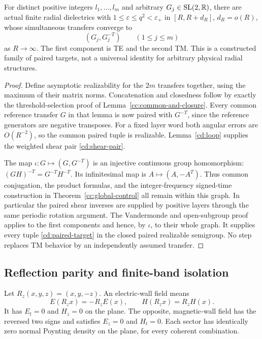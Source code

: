 \begin{theorem}
\label{cd:paired-control}
For distinct positive integers $l_1,\ldots,l_m$ and arbitrary
$G_j\in{\rm SL}(2,\mathbb R)$, there are actual finite radial
dielectrics with $1\leq\varepsilon\leq q^2<\varepsilon_+$ in
$[R,R+d_R]$, $d_R=o(R)$, whose simultaneous transfers converge to
\begin{equation}\label{cd:paired-target}
 (G_j,G_j^{-T})\qquad(1\leq j\leq m)
\end{equation}
as $R\to\infty$. The first component is TE and the second TM.
This is a constructed family of paired targets, not a universal
identity for arbitrary physical radial structures.
\end{theorem}
\begin{proof}
Define asymptotic realizability for the $2m$ transfers together,
using the maximum of their matrix norms. Concatenation and
closedness follow by exactly the threshold-selection proof of
Lemma~\ref{cc:common-and-closure}.
Every common reference transfer $G$ in that lemma is now paired
with $G^{-T}$, since the reference generators are negative
transposes. For a fixed layer word both angular errors are
$O(R^{-2})$, so the common paired tuple is realizable.
Lemma~\ref{cd:loop} supplies the weighted shear pair
\eqref{cd:shear-pair}.

The map $\iota:G\mapsto(G,G^{-T})$ is an injective continuous
group homomorphism: $(GH)^{-T}=G^{-T}H^{-T}$. Its infinitesimal
map is $A\mapsto(A,-A^T)$. Thus common conjugation, the product
formulas, and the integer-frequency signed-time construction in
Theorem~\ref{cc:global-control} all remain within this graph.
In particular the paired shear inverses are supplied by positive
layers through the same periodic rotation argument.
The Vandermonde and open-subgroup proof applies to the first
components and hence, by $\iota$, to their whole graph.
It supplies every tuple \eqref{cd:paired-target} in the closed
paired realizable semigroup. No step replaces TM behavior by an
independently assumed transfer.
\end{proof}

\subsection{Reflection parity and finite-band isolation}

Let $R_z(x,y,z)=(x,y,-z)$. An electric-wall field means
\begin{equation}\label{cd:electric-wall}
 E(R_zx)=-R_zE(x),\qquad H(R_zx)=R_zH(x).
\end{equation}
It has $E_t=0$ and $H_z=0$ on the plane. The opposite,
magnetic-wall field has the reversed two signs and satisfies
$E_z=0$ and $H_t=0$. Each sector has identically zero normal
Poynting density on the plane, for every coherent combination.

